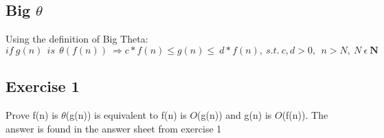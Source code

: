 \documentclass{article}
\begin{document}
\subsection{Big $\theta$}
Using the definition of Big Theta:
$$ if \ g(n)\ \ is\ \ \theta(f(n))\ \Rightarrow c*f(n) \leq g(n) \leq \ d*f(n), \ s.t.\ c, d > 0, \ \ n > N, \ N \ \epsilon \ \mathbf{N} $$
\subsection{Exercise 1}
Prove f(n) is $\theta$(g(n)) is equivalent to f(n) is $O$(g(n)) and g(n) is $O$(f(n)). The answer is found in the answer sheet from exercise 1
\end{document}
